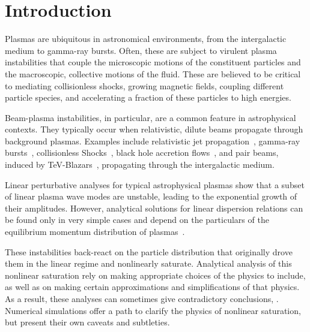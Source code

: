 \documentclass[pop,numberedappendix,iop]{aeb_emulateapj_2015}
\begin{document}
\section{Introduction}

Plasmas are ubiquitous in astronomical environments, from the intergalactic medium to gamma-ray bursts.  Often, these are subject to virulent plasma instabilities that couple the microscopic motions of the constituent particles and the macroscopic, collective motions of the fluid.
These are believed to be critical to mediating collisionless shocks, growing magnetic fields, coupling different particle species, and accelerating a fraction of these particles to high energies.

Beam-plasma instabilities, in particular, are a common feature in astrophysical contexts. They typically occur when relativistic, dilute beams propagate through background plasmas.
Examples include
relativistic jet propagation~\citep{Jet-sims2,Jet-sims1},
gamma-ray bursts~\citep{GRB+BP-instability1,GRB+BP-instability2},
collisionless Shocks~\citep{shock1,shock3,shock2}, 
black hole accretion flows~\citep{accretion1},
and pair beams, induced by TeV-Blazars~\citep{blazarI,Schlickeiser+12,Schlickeiser+13,nonlinear-paper,linear-paper}, propagating through the intergalactic medium. 


Linear perturbative analyses for typical astrophysical plasmas show that a subset of linear plasma wave modes are unstable, leading to the exponential growth of their amplitudes.
However, analytical solutions for linear dispersion relations can be found only in very simple cases
and depend on the particulars of the equilibrium momentum distribution of plasmas~\citep{Bret2010}.



These instabilities back-react on the particle distribution that originally drove them in the linear regime and nonlinearly saturate.  
Analytical analysis of this nonlinear saturation rely on making appropriate choices of the physics to include, as well as on making certain approximations and simplifications of that physics. 
As a result, these analyses can sometimes give contradictory conclusions, \citep[e.g.][]{Miniati-Elyiv-2013,nonlinear-paper}.  Numerical simulations offer a path to clarify the physics of nonlinear saturation, but present their own caveats and subtleties.
\end{document}
